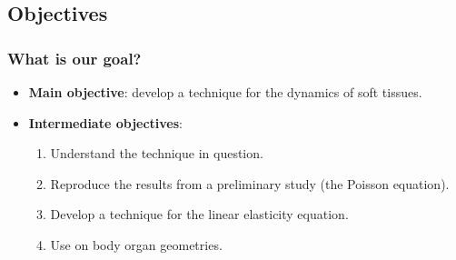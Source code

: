 \subsection{Objectives}

\begin{frame}
    \frametitle{What is our goal?}

    \begin{itemize}
        \item \textbf{Main objective}: develop a \phifem technique for the dynamics of soft tissues. \pause
        \item \textbf{Intermediate objectives}: 
        \begin{enumerate}
            \item Understand the \phifem technique in question. \pause
            \item Reproduce the results from a preliminary study (the Poisson equation). \pause
            \item Develop a \phifem technique for the linear elasticity equation. \pause
            \item Use \phifem on body organ geometries.
        \end{enumerate}
        
    \end{itemize}
\end{frame}




